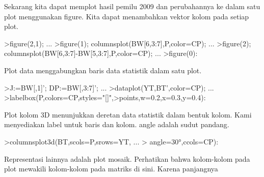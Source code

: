 \documentclass[a4paper,10pt]{article}
\begin{document}
\begin{eulernotebook}
\begin{eulercomment}
\begin{eulercomment}
\begin{eulercomment}
\begin{eulercomment}
\begin{eulercomment}
\begin{eulercomment}
\begin{eulercomment}
\begin{eulercomment}
\begin{eulercomment}
\begin{eulercomment}
\begin{eulercomment}
\begin{eulercomment}
\begin{eulercomment}
\begin{eulercomment}
\begin{eulercomment}
\begin{eulercomment}
\begin{eulercomment}
\begin{eulercomment}
\begin{eulercomment}
\begin{eulercomment}
\begin{eulercomment}
\begin{eulercomment}
\begin{eulercomment}
\begin{eulercomment}
\begin{eulercomment}
\begin{eulercomment}
\begin{eulercomment}
\begin{eulercomment}
\begin{eulercomment}
\begin{eulercomment}
\begin{eulercomment}
\begin{eulercomment}
\begin{eulercomment}
\begin{eulercomment}
\begin{eulercomment}
\begin{eulercomment}
\begin{eulercomment}
\begin{eulercomment}
\begin{eulercomment}
\begin{eulercomment}
\begin{eulercomment}
\begin{eulercomment}
\begin{eulercomment}
\begin{eulercomment}
\begin{eulercomment}
Sekarang kita dapat memplot hasil pemilu 2009 dan perubahannya ke
dalam satu plot menggunakan figure. Kita dapat menambahkan vektor
kolom pada setiap plot.
\end{eulercomment}
\begin{eulerprompt}
>figure(2,1);  ...
>figure(1); columnsplot(BW[6,3:7],P,color=CP); ...
>figure(2); columnsplot(BW[6,3:7]-BW[5,3:7],P,color=CP);  ...
>figure(0):
\end{eulerprompt}
\begin{eulercomment}
Plot data menggabungkan baris data statistik dalam satu plot.
\end{eulercomment}
\begin{eulerprompt}
>J:=BW[,1]'; DP:=BW[,3:7]'; ...
>dataplot(YT,BT',color=CP);  ...
>labelbox(P,colors=CP,styles="[]",>points,w=0.2,x=0.3,y=0.4):
\end{eulerprompt}
\begin{eulercomment}
Plot kolom 3D menunjukkan deretan data statistik dalam bentuk kolom.
Kami menyediakan label untuk baris dan kolom. angle adalah sudut
pandang.
\end{eulercomment}
\begin{eulerprompt}
>columnsplot3d(BT,scols=P,srows=YT, ...
>  angle=30°,ccols=CP):
\end{eulerprompt}
\begin{eulercomment}
Representasi lainnya adalah plot mosaik. Perhatikan bahwa kolom-kolom
pada plot mewakili kolom-kolom pada matriks di sini. Karena panjangnya

\end{eulercomment}
\end{eulercomment}
\end{eulercomment}
\end{eulercomment}
\end{eulercomment}
\end{eulercomment}
\end{eulercomment}
\end{eulercomment}
\end{eulercomment}
\end{eulercomment}
\end{eulercomment}
\end{eulercomment}
\end{eulercomment}
\end{eulercomment}
\end{eulercomment}
\end{eulercomment}
\end{eulercomment}
\end{eulercomment}
\end{eulercomment}
\end{eulercomment}
\end{eulercomment}
\end{eulercomment}
\end{eulercomment}
\end{eulercomment}
\end{eulercomment}
\end{eulercomment}
\end{eulercomment}
\end{eulercomment}
\end{eulercomment}
\end{eulercomment}
\end{eulercomment}
\end{eulercomment}
\end{eulercomment}
\end{eulercomment}
\end{eulercomment}
\end{eulercomment}
\end{eulercomment}
\end{eulercomment}
\end{eulercomment}
\end{eulercomment}
\end{eulercomment}
\end{eulercomment}
\end{eulercomment}
\end{eulercomment}
\end{eulercomment}
\end{eulernotebook}
\end{document}
